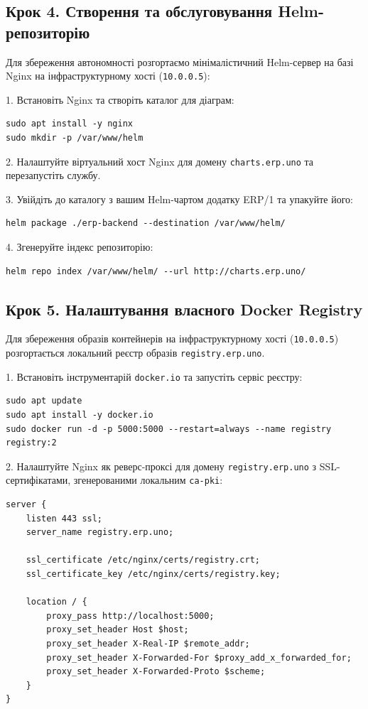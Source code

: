 \documentclass{article}
\begin{document}
\subsection{Крок 4. Створення та обслуговування Helm-репозиторію}
Для збереження автономності розгортаємо мінімалістичний Helm-сервер на базі Nginx на інфраструктурному хості (\texttt{10.0.0.5}):

1. Встановіть Nginx та створіть каталог для діаграм:
\begin{lstlisting}
sudo apt install -y nginx
sudo mkdir -p /var/www/helm
\end{lstlisting}

2. Налаштуйте віртуальний хост Nginx для домену \texttt{charts.erp.uno} та перезапустіть службу.

3. Увійдіть до каталогу з вашим Helm-чартом додатку ERP/1 та упакуйте його:
\begin{lstlisting}
helm package ./erp-backend --destination /var/www/helm/
\end{lstlisting}

4. Згенеруйте індекс репозиторію:
\begin{lstlisting}
helm repo index /var/www/helm/ --url http://charts.erp.uno/
\end{lstlisting}

\subsection{Крок 5. Налаштування власного Docker Registry}
Для збереження образів контейнерів на інфраструктурному хості (\texttt{10.0.0.5}) розгортається локальний реєстр образів \texttt{registry.erp.uno}.

1. Встановіть інструментарій \texttt{docker.io} та запустіть сервіс реєстру:
\begin{lstlisting}
sudo apt update
sudo apt install -y docker.io
sudo docker run -d -p 5000:5000 --restart=always --name registry registry:2
\end{lstlisting}

2. Налаштуйте Nginx як реверс-проксі для домену \texttt{registry.erp.uno} з SSL-сертифікатами, згенерованими локальним \texttt{ca-pki}:
\begin{lstlisting}[mathescape=false]
server {
    listen 443 ssl;
    server_name registry.erp.uno;

    ssl_certificate /etc/nginx/certs/registry.crt;
    ssl_certificate_key /etc/nginx/certs/registry.key;

    location / {
        proxy_pass http://localhost:5000;
        proxy_set_header Host $host;
        proxy_set_header X-Real-IP $remote_addr;
        proxy_set_header X-Forwarded-For $proxy_add_x_forwarded_for;
        proxy_set_header X-Forwarded-Proto $scheme;
    }
}
\end{lstlisting}
\end{document}
